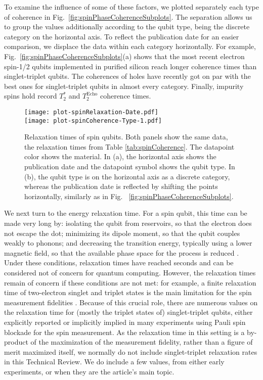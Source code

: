 \documentclass[aps, prx, showpacs, twocolumn, superscriptaddress, notitlepage, longbibliography, floatfix, nofootinbib]{revtex4-2}
\newcommand{\TEcho}{T_2^\mathrm{Echo}}
\newcommand{\recheck}[1]{{#1}}
\begin{document}
To examine the influence of some of these factors, we plotted separately each type of coherence in Fig.~\ref{fig:spinPhaseCoherenceSubplots}. The separation allows us to group the values additionally according to the qubit type, being the discrete category on the horizontal axis. To reflect the publication date for an easier comparison, we displace the data within each category horizontally. \recheck{For example, Fig.~\ref{fig:spinPhaseCoherenceSubplots}(a) shows that the most recent electron spin-1/2 qubits implemented in purified silicon reach longer coherence times than singlet-triplet qubits. The coherences of holes have recently got on par with the best ones for singlet-triplet qubits in almost every category. Finally, impurity spins hold record $T_2^*$ and $\TEcho$ coherence times.} 




\begin{figure}
  \texttt{[image: plot-spinRelaxation-Date.pdf]} \hfill\\
  \texttt{[image: plot-spinCoherence-Type-1.pdf]} \hfill
  \caption{
  \label{fig:spinRelaxation}
  Relaxation times of spin qubits. Both panels show the same data, the relaxation times from Table \ref{tab:spinCoherence}. The datapoint color shows the material. In (a), the horizontal axis shows the publication date and the datapoint symbol shows the qubit type. In (b), the qubit type is on the horizontal axis as a discrete category, whereas the publication date is reflected by shifting the points horizontally, similarly as in Fig. ~\ref{fig:spinPhaseCoherenceSubplots}.}
\end{figure}


We next turn to the energy relaxation time. For a spin qubit, this time can be made very long by: isolating the qubit from reservoirs, so that the electron does not escape the dot; minimizing its dipole moment, so that the qubit couples weakly to phonons; and decreasing the transition energy, typically using a lower magnetic field, so that the available phase space for the process is reduced \cite{shrivastava_theory_1983,khaetskii_spin-flip_2001}. Under these conditions, relaxation times have reached seconds and can be considered not of concern for quantum computing. However, the relaxation times remain of concern if these conditions are not met: for example, a finite relaxation time of two-electron singlet and triplet states is the main limitation for the spin measurement fidelities \cite{barthel_rapid_2009,nakajima_robust_2017,broome_high-fidelity_2017}. 
Because of this crucial role, there are numerous values on the relaxation time for (mostly the triplet states of) singlet-triplet qubits, either explicitly reported or implicitly implied in many experiments using Pauli spin blockade for the spin measurement. As the relaxation time in this setting is a by-product of the maximization of the measurement fidelity, rather than a figure of merit maximized itself, we normally do not include singlet-triplet relaxation rates in this Technical Review. We do include a few values, from either early experiments, or when they are the article's main topic.
\end{document}
